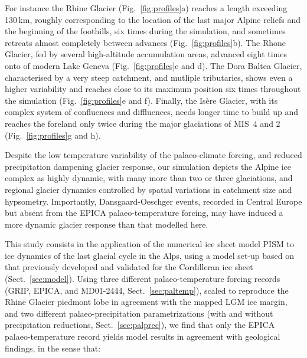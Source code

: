 \documentclass[tc, manuscript]{copernicus}
\begin{document}
    For instance the Rhine Glacier (Fig.~\ref{fig:profiles}a) reaches a length
    exceeding 130\,km, roughly corresponding to the location of the last major
    Alpine reliefs and the beginning of the foothills, six times during the
    simulation, and sometimes retreats almost completely between advances
    (Fig.~\ref{fig:profiles}b). The Rhone Glacier, fed by several high-altitude
    accumulation areas, advanced eight times onto of modern Lake
    Geneva (Fig.~\ref{fig:profiles}c and d). The Dora Baltea Glacier, characterised
    by a very steep catchment, and mutliple tributaries, shows even a higher
    variability and reaches close to its maximum position six times throughout
    the simulation (Fig.~\ref{fig:profiles}e and f). Finally, the Isère
    Glacier, with its complex system of confluences and diffluences, needs
    longer time to build up and reaches the foreland only twice during the
    major glaciations of MIS~4 and 2 (Fig.~\ref{fig:profiles}g and h).

    Despite the low temperature variability of the palaeo-climate forcing, and
    reduced precipitation dampening glacier response, our simulation depicts
    the Alpine ice complex as highly dynamic, with many more than two or three
    \citep[cf.][]{Preusser.2004,Ivy-Ochs.etal.2008} glaciations, and regional
    glacier dynamics controlled by spatial variations in catchment size and
    hypsometry. Importantly, Dansgaard-Oeschger events, recorded in Central
    Europe \citep{Spotl.Mangini.2002, Wohlfarth.etal.2008,
    Luetscher.etal.2015} but absent from the EPICA palaeo-temperature forcing,
    may have induced a more dynamic glacier response than that modelled here.


\conclusions

    This study consists in the application of the numerical ice sheet model
    PISM to ice dynamics of the last glacial cycle in the Alps, using a model
    set-up based on that previously developed and validated for the Cordilleran
    ice sheet (Sect.~\ref{sec:model}).
    Using three different palaeo-temperature forcing records (GRIP, EPICA, and
    MD01-2444, Sect.~\ref{sec:paltemp}), scaled to reproduce the Rhine Glacier
    piedmont lobe in agreement with the mapped LGM ice margin, and two
    different palaeo-precipitation parametrizations (with and without
    precipitation reductions, Sect.~\ref{sec:palprec}), we find that only the
    EPICA palaeo-temperature record yields model results in agreement with
    geological findings, in the sense that:
\end{document}

